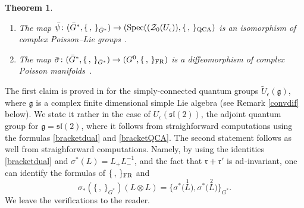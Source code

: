 \documentclass[pdftex]{sigma}%
\numberwithin{equation}{section}
\numberwithin{figure}{section}
\newtheorem{teo}{Theorem}[section]
\newcommand{\ra}{\rightarrow}
\begin{document}
\begin{teo}\label{relbracket}%
\quad

\begin{enumerate}\itemsep=0pt
\item[$1.$] The map $\bar \psi\colon (\bar G^*,\{\, ,\, \}_{\bar G^*})\ra (\operatorname{Spec}((\mathcal{Z}_0(U_\epsilon)),\{\, ,\, \}_{\rm QCA})$ is an isomorphism of complex Pois\-son--Lie groups {\rm \cite{DC-K-P1,DC-K-P2}}.

\item[$2.$] The map $\bar \sigma\colon (\bar G^*,\{\, ,\, \}_{\bar G^*})\ra (G^0,\{\, ,\, \}_{\rm FR})$ is a diffeomorphism of complex Poisson mani\-folds~{\rm \cite{STS}}.
 \end{enumerate}
\end{teo}
The first claim is proved in \cite{DC-K-P1,DC-K-P2} for the simply-connected quantum groups $\tilde U_\epsilon(\mathfrak{g})$, where $\mathfrak{g}$ is a complex finite dimensional simple Lie algebra (see Remark \ref{convdif} below). We state it rather in the case of $U_\epsilon({\mathfrak{sl}}(2))$, the adjoint quantum group for $\mathfrak{g} = {\mathfrak{sl}}(2)$, where it follows from straighforward computations using the formulas \eqref{bracketdual} and \eqref{bracketQCA}. The second statement follows as well from straighforward computations. Namely, by using the identities \eqref{bracketdual} and $\sigma^*(L) = L_+L_-^{-1}$, and the fact that $\mathfrak{r}+\mathfrak{r}'$ is ${\rm ad}$-invariant, one can identify the formulas of $\{\, ,\, \}_{\rm FR}$ and
\[
\sigma_*(\{\, ,\, \}_{G^*})(L\otimes L) = \big\{\sigma^*\big(\!\stackrel{1}{L}\!\big),\sigma^*\big(\!\stackrel{2}{L}\!\big)\big\}_{G^*}.
\]
We leave the verifications to the reader.
\end{document}
